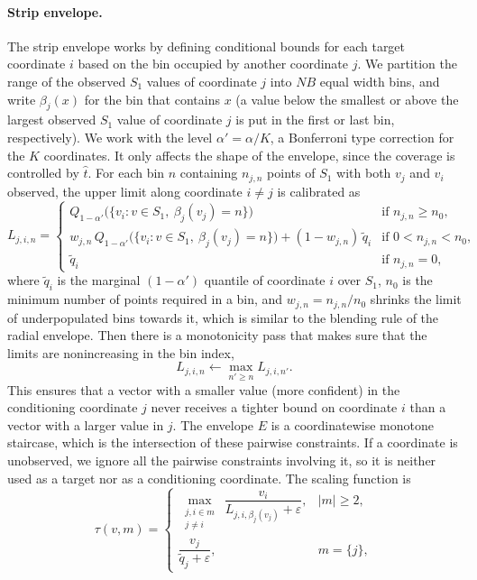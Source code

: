 \paragraph{Strip envelope.} The strip envelope works by defining conditional bounds for each target coordinate $i$ based on the 
bin occupied by another coordinate $j$. We partition the range of the observed $S_1$ values of coordinate $j$ into $NB$ equal width 
bins, and write $\beta_j(x)$ for the bin that contains $x$ (a value below the smallest or above the largest observed $S_1$ value of 
coordinate $j$ is put in the first or last bin, respectively). We work with the level $\alpha'=\alpha/K$, a Bonferroni type correction 
for the $K$ coordinates. It only affects the shape of the envelope, since the coverage is controlled by $\hat t$. For each bin $n$ 
containing $n_{j,n}$ points of $S_1$ with both $v_j$ and $v_i$ observed, the upper limit along coordinate $i\neq j$ is calibrated as
\begin{equation}\label{eq:limits}
L_{j,i,n}=\begin{cases}
Q_{1-\alpha'}\bigl(\{v_i:v\in S_1,\ \beta_j(v_j)=n\}\bigr) & \text{if } n_{j,n}\ge n_0,\\[1ex]
w_{j,n}\,Q_{1-\alpha'}\bigl(\{v_i:v\in S_1,\ \beta_j(v_j)=n\}\bigr)+(1-w_{j,n})\,\tilde q_i & \text{if } 0<n_{j,n}<n_0,\\[1ex]
\tilde q_i & \text{if } n_{j,n}=0,
\end{cases}
\end{equation}
where $\tilde q_i$ is the marginal $(1-\alpha')$ quantile of coordinate $i$ over $S_1$, $n_0$ is the minimum number of points required 
in a bin, and $w_{j,n}=n_{j,n}/n_0$ shrinks the limit of underpopulated bins towards it, which is similar to the blending rule of the 
radial envelope. Then there is a monotonicity pass that makes sure that the limits are nonincreasing in the bin index,
\begin{equation}\label{eq:monotone}
L_{j,i,n}\leftarrow\max_{n'\ge n}L_{j,i,n'}.
\end{equation}
This ensures that a vector with a smaller value (more confident) in the conditioning coordinate $j$ never receives a tighter bound 
on coordinate $i$ than a vector with a larger value in $j$. The envelope $E$ is a coordinatewise monotone staircase, which is the intersection of these 
pairwise constraints. If a coordinate is unobserved, we ignore all the pairwise constraints involving it, so it is neither used as 
a target nor as a conditioning coordinate. The scaling function is
\begin{equation}\label{eq:strip}
\tau(v,m)=\begin{cases}
\displaystyle\max_{\substack{j,i\in m\\ j\ne i}}\ \dfrac{v_i}{L_{j,i,\beta_j(v_j)}+\varepsilon}, & |m|\ge 2,\\[3ex]
\dfrac{v_j}{\tilde q_j+\varepsilon}, & m=\{j\},
\end{cases}
\end{equation}
